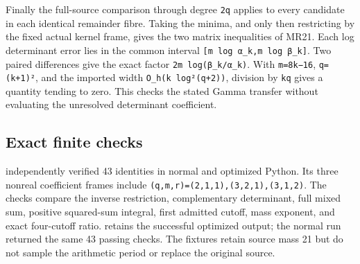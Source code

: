 \documentclass[11pt]{article}
\begin{document}
Finally the full-source comparison through degree \texttt{2q} applies to every candidate in each identical remainder fibre. Taking the minima, and only then restricting by the fixed actual kernel frame, gives the two matrix inequalities of MR21. Each log determinant error lies in the common interval \texttt{{[}m\ log\ α\_k,m\ log\ β\_k{]}}. Two paired differences give the exact factor \texttt{2m\ log(β\_k/α\_k)}. With \texttt{m=8k−16}, \texttt{q=(k+1)²}, and the imported width \texttt{O\_h(k\ log²(q+2))}, division by \texttt{kq} gives a quantity tending to zero. This checks the stated Gamma transfer without evaluating the unresolved determinant coefficient.

\subsection{Exact finite checks}\label{exact-finite-checks}

 independently verified 43 identities in normal and optimized Python. Its three nonreal coefficient frames include \texttt{(q,m,r)=(2,1,1),(3,2,1),(3,1,2)}. The checks compare the inverse restriction, complementary determinant, full mixed sum, positive squared-sum integral, first admitted cutoff, mass exponent, and exact four-cutoff ratio.  retains the successful optimized output; the normal run returned the same 43 passing checks. The fixtures retain source mass 21 but do not sample the arithmetic period or replace the original source.
\end{document}
